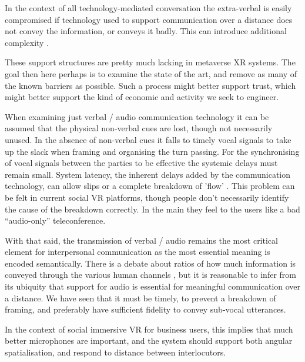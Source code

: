 In the context of all technology-mediated conversation the extra-verbal is easily compromised if technology used to support communication over a distance does not convey the information, or conveys it badly. This can introduce additional complexity \cite{Otsuka2005}.\par
These support structures are pretty much lacking in metaverse XR systems. The goal then here perhaps is to examine the state of the art, and remove as many of the known barriers as possible. Such a process might better support trust, which might better support the kind of economic and activity we seek to engineer.\par
When examining just verbal / audio communication technology it can be assumed that the physical non-verbal cues are lost, though not necessarily unused. In the absence of non-verbal cues it falls to timely vocal signals to take up the slack when framing and organising the turn passing. For the synchronising of vocal signals between the parties to be effective the systemic delays must remain small. System latency, the inherent delays added by the communication technology, can allow slips or a complete breakdown of 'flow' \cite{katagiri2007aiduti}. This problem can be felt in current social VR platforms, though people don't necessarily identify the cause of the breakdown correctly. In the main they feel to the users like a bad ``audio-only'' teleconference.\par
With that said, the transmission of verbal / audio remains the most critical element for interpersonal communication as the most essential meaning is encoded semantically. There is a debate about ratios of how much information is conveyed through the various human channels \cite{Loomis2012}, but it is reasonable to infer from its ubiquity that support for audio is essential for meaningful communication over a distance. We have seen that it must be timely, to prevent a breakdown of framing, and preferably have sufficient fidelity to convey sub-vocal utterances. \par
In the context of social immersive VR for business users, this implies that much better microphones are important, and the system should support both angular spatialisation, and respond to distance between interlocutors.

